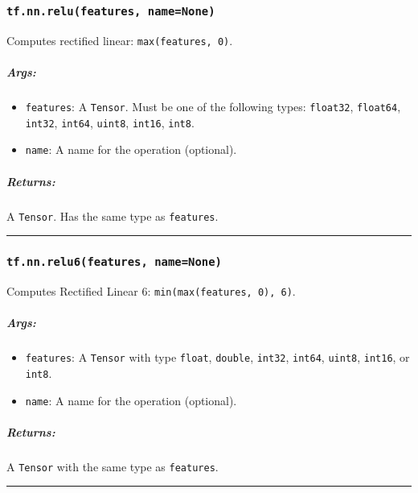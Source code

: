 \subsubsection{\texorpdfstring{\texttt{tf.nn.relu(features,\ name=None)}
}{tf.nn.relu(features, name=None) }}\label{tf.nn.relufeatures-namenone}

Computes rectified linear: \texttt{max(features,\ 0)}.

\subparagraph{Args: }\label{args}

\begin{itemize}
\tightlist
\item
  \texttt{features}: A \texttt{Tensor}. Must be one of the following
  types: \texttt{float32}, \texttt{float64}, \texttt{int32},
  \texttt{int64}, \texttt{uint8}, \texttt{int16}, \texttt{int8}.
\item
  \texttt{name}: A name for the operation (optional).
\end{itemize}

\subparagraph{Returns: }\label{returns}

A \texttt{Tensor}. Has the same type as \texttt{features}.

\begin{center}\rule{0.5\linewidth}{\linethickness}\end{center}

\subsubsection{\texorpdfstring{\texttt{tf.nn.relu6(features,\ name=None)}
}{tf.nn.relu6(features, name=None) }}\label{tf.nn.relu6features-namenone}

Computes Rectified Linear 6: \texttt{min(max(features,\ 0),\ 6)}.

\subparagraph{Args: }\label{args-1}

\begin{itemize}
\tightlist
\item
  \texttt{features}: A \texttt{Tensor} with type \texttt{float},
  \texttt{double}, \texttt{int32}, \texttt{int64}, \texttt{uint8},
  \texttt{int16}, or \texttt{int8}.
\item
  \texttt{name}: A name for the operation (optional).
\end{itemize}

\subparagraph{Returns: }\label{returns-1}

A \texttt{Tensor} with the same type as \texttt{features}.

\begin{center}\rule{0.5\linewidth}{\linethickness}\end{center}

